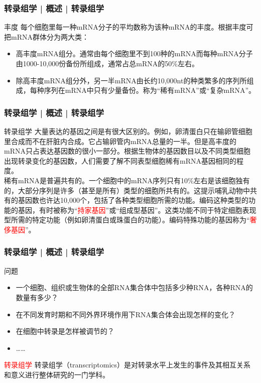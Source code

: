 \begin{frame}
  \frametitle{转录组学 | 概述 | 转录组学}
\begin{block}{丰度}
每个细胞里每一种mRNA分子的平均数称为该种mRNA的丰度。根据丰度可把mRNA群体分为两大类：
\begin{itemize}
  \item 高丰度mRNA组分。通常由每个细胞里不到100种的mRNA而每种mRNA分子由1000-10,000份备份所组成，通常占总mRNA的50\%左右。
  \item 除高丰度mRNA组分外，另一半mRNA由长约10,000nt的种类繁多的序列所组成，每种序列在mRNA中只有少量备份。称为“稀有mRNA”或“复杂mRNA”。
\end{itemize}
  \end{block}
\end{frame}

\begin{frame}
  \frametitle{转录组学 | 概述 | 转录组学}
  \begin{block}{转录组学}
大量表达的基因之间是有很大区别的。例如，卵清蛋白只在输卵管细胞里合成而不在肝脏内合成。它占输卵管内mRNA总量的一半。但是高丰度的mRNA只占表达基因数的很小一部分。根据生物体的基因数目以及不同类型细胞出现转录变化的基因数，人们需要了解不同表型细胞稀有mRNA基因相同的程度。\\
\vspace{1em}
稀有mRNA是普遍共有的。一个细胞中的mRNA序列只有10\%左右是该细胞独有的，大部分序列是许多（甚至是所有）类型的细胞所共有的。这提示哺乳动物中共有的基因数也许达10,000个，包括了各种类型细胞所需的功能。编码这种类型的功能的基因，有时被称为“\textcolor{red}{持家基因}”或“组成型基因”。这类功能不同于特定细胞表现型所需的特定功能（例如卵清蛋白或珠蛋白的功能）。编码特殊功能的基因称为“\textcolor{red}{奢侈基因}”。
  \end{block}
\end{frame}

\begin{frame}
  \frametitle{转录组学 | 概述 | 转录组学}
  \begin{block}{问题}
    \begin{itemize}
      \item 一个细胞、组织或生物体的全部RNA集合体中包括多少种RNA，各种RNA的数量有多少？
      \item 在不同发育时期和不同外界环境作用下RNA集合体会出现怎样的变化？
      \item 在细胞中转录是怎样被调节的？
      \item ……
    \end{itemize}
  \end{block}
  \pause
  \begin{block}{\textcolor{red}{转录组学}}
    转录组学（transcriptomics）是对转录水平上发生的事件及其相互关系和意义进行整体研究的一门学科。
  \end{block}
\end{frame}

